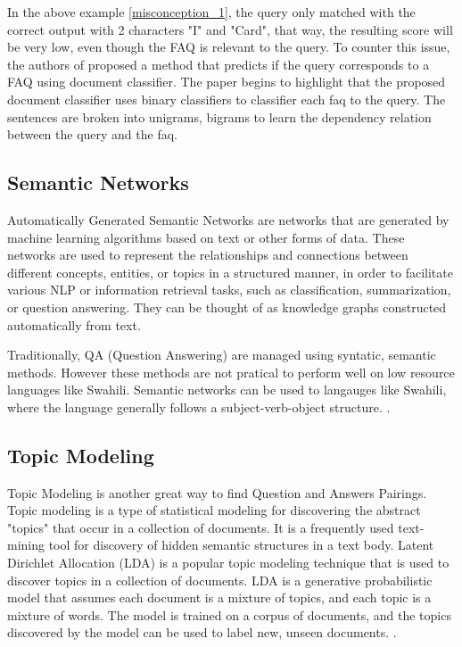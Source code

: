 In the above example \ref*{misconception_1}, the query only matched with the correct output with 2 characters "I" and "Card", that way, the resulting score will be very low, even though the FAQ is relevant to the query. To counter this issue, the authors of \cite{10.1007/978-3-319-42911-3_25} proposed a method that predicts if the query corresponds to a FAQ using document classifier. The paper begins to highlight that the proposed document classifier uses binary classifiers to classifier each faq to the query. The sentences are broken into unigrams, bigrams to learn the dependency relation between the query and the faq.

\pagebreak
\subsection{Semantic Networks}
Automatically Generated Semantic Networks are networks that are generated by machine learning algorithms based on text or other forms of data. These networks are used to represent the relationships and connections between different concepts, entities, or topics in a structured manner, in order to facilitate various NLP or information retrieval tasks, such as classification, summarization, or question answering. They can be thought of as knowledge graphs constructed automatically from text.

Traditionally, QA (Question Answering) are managed using syntatic, semantic methods. However these methods are not pratical to perform well on low resource languages like Swahili. Semantic networks can be used to langauges like Swahili, where the language generally follows a subject-verb-object structure. \cite{9144082}.

\pagebreak
\subsection{Topic Modeling}
Topic Modeling is another great way to find Question and Answers Pairings. Topic modeling is a type of statistical modeling for discovering the abstract "topics" that occur in a collection of documents. It is a frequently used text-mining tool for discovery of hidden semantic structures in a text body. Latent Dirichlet Allocation (LDA) is a popular topic modeling technique that is used to discover topics in a collection of documents. LDA is a generative probabilistic model that assumes each document is a mixture of topics, and each topic is a mixture of words. The model is trained on a corpus of documents, and the topics discovered by the model can be used to label new, unseen documents. \cite{6227139}.

